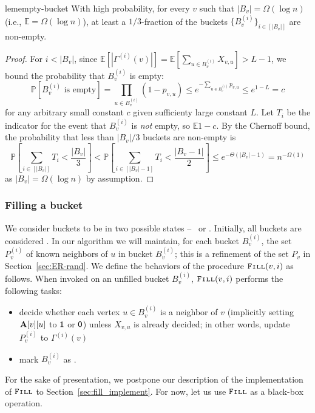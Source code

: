 \begin{restatable}{lem}{empty-bucket}
\label{lem:empty_bucket}
With high probability, for every $v$ such that $|B_v| = \Omega(\log n)$ (i.e., $\mathbb E = \Omega(\log n)$), at least a $1/3$-fraction of the buckets $\{B_v^{(i)}\}_{i\in[|B_v|]}$ are non-empty.
\end{restatable}
\begin{proof}
For $i < |B_v|$, since $ \mathbb{E} \left[ |\Gamma^{(i)}(v)| \right] =\mathbb{E} \left[ \sum_{u\in B_v^{(i)}} X_{v,u} \right] > L-1$, we bound the probability that $B_v^{(i)}$ is empty:
$$\mathbb P[B_v^{(i)}\textrm{ is empty}] = \prod_{u\in B_v^{(i)}} (1-p_{v,u}) \leq e^{-\sum_{u\in B_v^{(i)}} p_{v,u}} \leq e^{1-L}=c
$$
for any arbitrary small constant $c$ given sufficienty large constant $L$. Let $T_{i}$ be the indicator for the event that $B_v^{(i)}$ is \emph{not} empty, so $\mathbb E 1-c$. By the Chernoff bound, the probability that less than $|B_v|/3$ buckets are non-empty is 
$$\textstyle
\mathbb P\left[\sum_{i\in[|B_v|]} T_i<\frac{|B_v|}{3}\right]<\mathbb P\left[\sum_{i\in[|B_v|-1]} T_i<\frac{|B_v-1|}{2}\right]\leq e^{-\Theta(|B_v|-1)} = n^{-\Omega(1)}
$$ as $|B_v| = \Omega(\log n)$ by assumption.
\end{proof}




\subsubsection{Filling a bucket}
\label{sec:bucket_filling}

We consider buckets to be in two possible states -- \filled~or \unfilled.
Initially, all buckets are considered \unfilled.
In our algorithm we will maintain, for each bucket $B^{(i)}_v$, the set $P^{(i)}_v$ of known neighbors of $u$ in bucket $B^{(i)}_v$; this is a refinement of the set $P_v$ in Section~\ref{sec:ER-rand}. 
We define the behaviors of the procedure $\texttt{\textsc{Fill}}(v,i)$ as follows. When invoked on an unfilled bucket $B_v^{(i)}$, $\texttt{\textsc{Fill}}(v,i)$ performs the following tasks:
\begin{itemize}
\item decide whether each vertex $u \in B_v^{(i)}$ is a neighbor of $v$ (implicitly setting $\mathbf{A}[v][u]$ to $\mathsf{1}$ or $\mathsf{0}$) unless $X_{v,u}$ is already decided; in other words, update $P_v^{(i)}$ to $\Gamma^{(i)}(v)$
\item mark $B_v^{(i)}$ as \filled.
\end{itemize}
For the sake of presentation, we postpone our description of the implementation of $\texttt{\textsc{Fill}}$ to Section~\ref{sec:fill_implement}. For now, let us use $\texttt{\textsc{Fill}}$ as a black-box operation.





